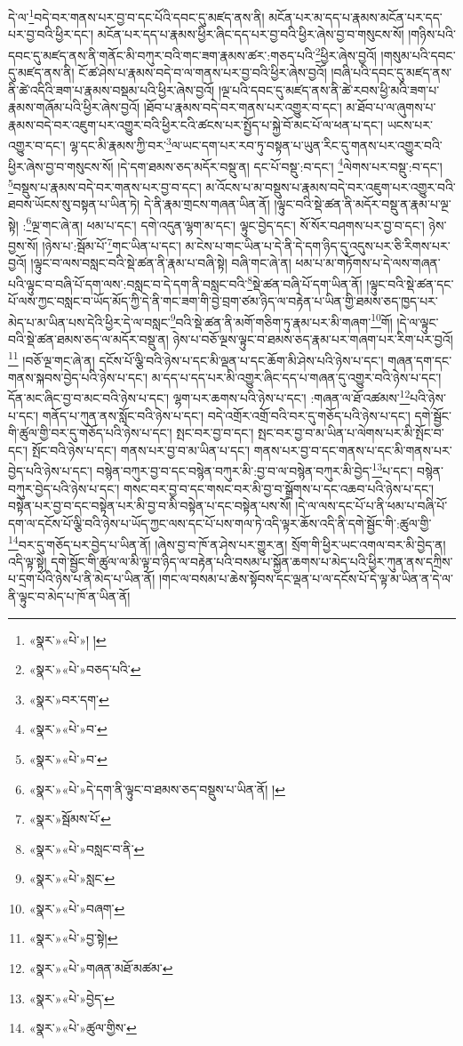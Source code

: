 དེ་ལ་\footnote{«སྣར་»«པེ་»། །}བདེ་བར་གནས་པར་བྱ་བ་དང་པོའི་དབང་དུ་མཛད་ནས་ནི། མངོན་པར་མ་དད་པ་རྣམས་མངོན་པར་དད་པར་བྱ་བའི་ཕྱིར་དང་། མངོན་པར་དད་པ་རྣམས་ཕྱིར་ཞིང་དད་པར་བྱ་བའི་ཕྱིར་ཞེས་བྱ་བ་གསུངས་སོ། །གཉིས་པའི་དབང་དུ་མཛད་ནས་ནི་གནོང་མི་བཀུར་བའི་གང་ཟག་རྣམས་ཚར་:གཅད་པའི་\footnote{«སྣར་»«པེ་»བཅད་པའི་}ཕྱིར་ཞེས་བྱའོ། །གསུམ་པའི་དབང་དུ་མཛད་ནས་ནི། ངོ་ཚ་ཤེས་པ་རྣམས་བདེ་བ་ལ་གནས་པར་བྱ་བའི་ཕྱིར་ཞེས་བྱའོ། །བཞི་པའི་དབང་དུ་མཛད་ནས་ནི་ཚེ་འདིའི་ཟག་པ་རྣམས་བསྡམ་པའི་ཕྱིར་ཞེས་བྱའོ། །ལྔ་པའི་དབང་དུ་མཛད་ནས་ནི་ཚེ་རབས་ཕྱི་མའི་ཟག་པ་རྣམས་གཞོམ་པའི་ཕྱིར་ཞེས་བྱའོ། །ཐོབ་པ་རྣམས་བདེ་བར་གནས་པར་འགྱུར་བ་དང་། མ་ཐོབ་པ་ལ་ཞུགས་པ་རྣམས་བདེ་བར་འཇུག་པར་འགྱུར་བའི་ཕྱིར་ངའི་ཚངས་པར་སྤྱོད་པ་སྐྱེ་བོ་མང་པོ་ལ་ཕན་པ་དང་། ཡངས་པར་འགྱུར་བ་དང་། ལྷ་དང་མི་རྣམས་ཀྱི་བར་\footnote{«སྣར་»བར་དག་}ལ་ཡང་དག་པར་རབ་ཏུ་བསྟན་པ་ཡུན་རིང་དུ་གནས་པར་འགྱུར་བའི་ཕྱིར་ཞེས་བྱ་བ་གསུངས་སོ། །དེ་དག་ཐམས་ཅད་མདོར་བསྡུ་ན། དང་པོ་བསྡུ་:བ་དང་། \footnote{«སྣར་»«པེ་»བ་}ལེགས་པར་བསྡུ་:བ་དང་། \footnote{«སྣར་»«པེ་»བ་}བསྡུས་པ་རྣམས་བདེ་བར་གནས་པར་བྱ་བ་དང་། མ་འོངས་པ་མ་བསྡུས་པ་རྣམས་བདེ་བར་འཇུག་པར་འགྱུར་བའི་ཐབས་ཡོངས་སུ་བསྟན་པ་ཡིན་ཏེ། དེ་ནི་རྣམ་གྲངས་གཞན་ཡིན་ནོ། །ལྟུང་བའི་སྡེ་ཚན་ནི་མདོར་བསྡུ་ན་རྣམ་པ་ལྔ་སྟེ། :\footnote{«སྣར་»«པེ་»དེ་དག་ནི་ལྟུང་བ་ཐམས་ཅད་བསྡུས་པ་ཡིན་ནོ། །}ལྔ་གང་ཞེ་ན། ཕམ་པ་དང་། དགེ་འདུན་ལྷག་མ་དང་། ལྟུང་བྱེད་དང་། སོ་སོར་བཤགས་པར་བྱ་བ་དང་། ཉེས་བྱས་སོ། །ཉེས་པ་:སྦོམ་པོ་\footnote{«སྣར་»སྦོམས་པོ་}གང་ཡིན་པ་དང་། མ་ངེས་པ་གང་ཡིན་པ་དེ་ནི་དེ་དག་ཉིད་དུ་འདུས་པར་ཅི་རིགས་པར་བྱའོ། །ལྟུང་བ་ལས་བསླང་བའི་སྡེ་ཚན་ནི་རྣམ་པ་བཞི་སྟེ། བཞི་གང་ཞེ་ན། ཕམ་པ་མ་གཏོགས་པ་དེ་ལས་གཞན་པའི་ལྟུང་བ་བཞི་པོ་དག་ལས་:བསླང་བ་དེ་དག་ནི་བསླང་བའི་\footnote{«སྣར་»«པེ་»བསླང་བ་ནི་}སྡེ་ཚན་བཞི་པོ་དག་ཡིན་ནོ། །ལྟུང་བའི་སྡེ་ཚན་དང་པོ་ལས་ཀྱང་བསླང་བ་ཡོད་མོད་ཀྱི་དེ་ནི་གང་ཟག་གི་བྱེ་བྲག་ཙམ་ཉིད་ལ་བརྟེན་པ་ཡིན་གྱི་ཐམས་ཅད་ཁྱད་པར་མེད་པ་མ་ཡིན་པས་དེའི་ཕྱིར་དེ་ལ་བསླང་\footnote{«སྣར་»«པེ་»སླང་}བའི་སྡེ་ཚན་ནི་མགོ་གཅིག་ཏུ་རྣམ་པར་མི་གཞག་\footnote{«སྣར་»«པེ་»བཞག་}གོ། །དེ་ལ་ལྟུང་བའི་སྡེ་ཚན་ཐམས་ཅད་ལ་མདོར་བསྡུ་ན། ཉེས་པ་བཅོ་ལྔས་ལྟུང་བ་ཐམས་ཅད་རྣམ་པར་གཞག་པར་རིག་པར་བྱའོ།\footnote{«སྣར་»«པེ་»བྱ་སྟེ།} །བཅོ་ལྔ་གང་ཞེ་ན། དངོས་པོ་ལྕི་བའི་ཉེས་པ་དང་མི་ལྡན་པ་དང་ཆོག་མི་ཤེས་པའི་ཉེས་པ་དང་། གཞན་དག་དང་གནས་སྐབས་བྱེད་པའི་ཉེས་པ་དང་། མ་དད་པ་དད་པར་མི་འགྱུར་ཞིང་དད་པ་གཞན་དུ་འགྱུར་བའི་ཉེས་པ་དང་། དོན་མང་ཞིང་བྱ་བ་མང་བའི་ཉེས་པ་དང་། ལྷག་པར་ཆགས་པའི་ཉེས་པ་དང་། :གཞན་ལ་ཐོ་འཚམས་\footnote{«སྣར་»«པེ་»གཞན་མཐོ་མཚམ་}པའི་ཉེས་པ་དང་། གནོད་པ་ཀུན་ནས་སློང་བའི་ཉེས་པ་དང་། བདེ་འགྲོར་འགྲོ་བའི་བར་དུ་གཅོད་པའི་ཉེས་པ་དང་། དགེ་སྦྱོང་གི་ཚུལ་གྱི་བར་དུ་གཅོད་པའི་ཉེས་པ་དང་། སྤང་བར་བྱ་བ་དང་། སྤང་བར་བྱ་བ་མ་ཡིན་པ་ལེགས་པར་མི་སྤོང་བ་དང་། སྤོང་བའི་ཉེས་པ་དང་། གནས་པར་བྱ་བ་མ་ཡིན་པ་དང་། གནས་པར་བྱ་བ་དང་གནས་པ་དང་མི་གནས་པར་བྱེད་པའི་ཉེས་པ་དང་། བསྙེན་བཀུར་བྱ་བ་དང་བསྙེན་བཀུར་མི་:བྱ་བ་ལ་བསྙེན་བཀུར་མི་བྱེད་\footnote{«སྣར་»«པེ་»བྱེད་}པ་དང་། བསྙེན་བཀུར་བྱེད་པའི་ཉེས་པ་དང་། གསང་བར་བྱ་བ་དང་གསང་བར་མི་བྱ་བ་སྒྲོགས་པ་དང་འཆབ་པའི་ཉེས་པ་དང་། བསྟེན་པར་བྱ་བ་དང་བསྟེན་པར་མི་བྱ་བ་མི་བསྟེན་པ་དང་བསྟེན་པས་སོ། །དེ་ལ་ལས་དང་པོ་པ་ནི་ཕམ་པ་བཞི་པོ་དག་ལ་དངོས་པོ་ལྕི་བའི་ཉེས་པ་ཡོད་ཀྱང་ལས་དང་པོ་པས་གལ་ཏེ་འདི་ལྟར་ཆོས་འདི་ནི་དགེ་སྦྱོང་གི་:ཚུལ་གྱི་\footnote{«སྣར་»«པེ་»ཚུལ་གྱིས་}བར་དུ་གཅོད་པར་བྱེད་པ་ཡིན་ནོ། །ཞེས་བྱ་བ་ཁོ་ན་ཤེས་པར་གྱུར་ན། སྲོག་གི་ཕྱིར་ཡང་འགལ་བར་མི་བྱེད་ན། འདི་ལྟ་སྟེ། དགེ་སྦྱོང་གི་ཚུལ་ལ་མི་ལྟ་བ་ཉིད་ལ་བརྟེན་པའི་བསམ་པ་སྐྱོན་ཆགས་པ་མེད་པའི་ཕྱིར་ཀུན་ནས་དཀྲིས་པ་དྲག་པོའི་ཉེས་པ་ནི་མེད་པ་ཡིན་ནོ། །གང་ལ་བསམ་པ་ཆེས་སྟོབས་དང་ལྡན་པ་ལ་དངོས་པོ་དེ་ལྟ་མ་ཡིན་ན་དེ་ལ་ནི་ལྟུང་བ་མེད་པ་ཁོ་ན་ཡིན་ནོ། 